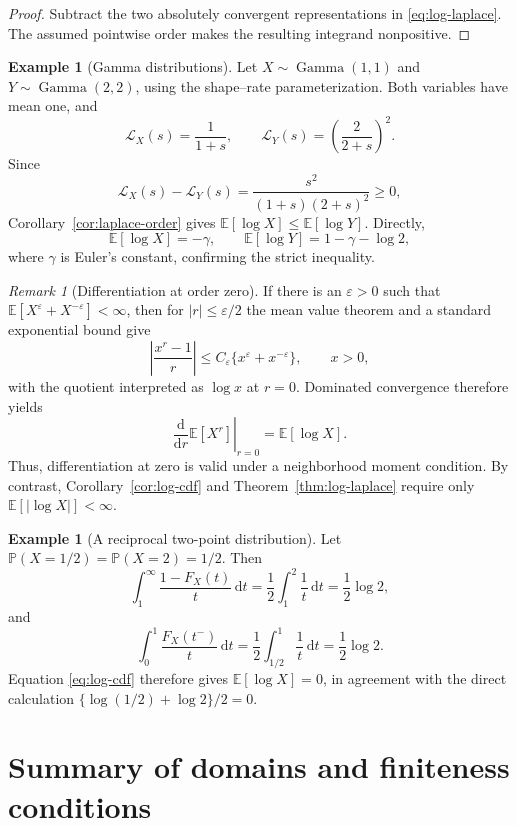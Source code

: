 \documentclass[11pt]{article}
\theoremstyle{definition}
\newtheorem{example}[theorem]{Example}
\theoremstyle{remark}
\newtheorem{remark}[theorem]{Remark}
\newcommand{\E}{\mathbb{E}}
\newcommand{\Pp}{\mathbb{P}}
\newcommand{\dd}{\,\mathrm{d}}
\newcommand{\abs}[1]{\left\lvert #1\right\rvert}
\begin{document}
\begin{proof}
Subtract the two absolutely convergent representations in
\eqref{eq:log-laplace}.  The assumed pointwise order makes the resulting
integrand nonpositive.
\end{proof}

\begin{example}[Gamma distributions]\label{ex:gamma-order}
Let $X\sim\operatorname{Gamma}(1,1)$ and
$Y\sim\operatorname{Gamma}(2,2)$, using the shape--rate parameterization.
Both variables have mean one, and
\[
  \mathcal L_X(s)=\frac{1}{1+s},
  \qquad
  \mathcal L_Y(s)=\left(\frac{2}{2+s}\right)^2.
\]
Since
\[
  \mathcal L_X(s)-\mathcal L_Y(s)
  =\frac{s^2}{(1+s)(2+s)^2}\geq0,
\]
Corollary~\ref{cor:laplace-order} gives
$\E[\log X]\leq\E[\log Y]$.  Directly,
\[
  \E[\log X]=-\gamma,
  \qquad
  \E[\log Y]=1-\gamma-\log2,
\]
where $\gamma$ is Euler's constant, confirming the strict inequality.
\end{example}

\begin{remark}[Differentiation at order zero]\label{rem:derivative-zero}
If there is an $\varepsilon>0$ such that
$\E[X^\varepsilon+X^{-\varepsilon}]<\infty$, then for
$\abs r\leq\varepsilon/2$ the mean value theorem and a standard exponential
bound give
\[
  \left\lvert\frac{x^r-1}{r}\right\rvert
  \leq C_\varepsilon\{x^\varepsilon+x^{-\varepsilon}\},
  \qquad x>0,
\]
with the quotient interpreted as $\log x$ at $r=0$.  Dominated convergence
therefore yields
\[
  \left.\frac{\mathrm d}{\mathrm dr}\E[X^r]\right|_{r=0}
  =\E[\log X].
\]
Thus, differentiation at zero is valid under a neighborhood moment
condition.  By contrast, Corollary~\ref{cor:log-cdf} and
Theorem~\ref{thm:log-laplace} require only
$\E[\abs{\log X}]<\infty$.
\end{remark}

\begin{example}[A reciprocal two-point distribution]\label{ex:log-two-point}
Let $\Pp(X=1/2)=\Pp(X=2)=1/2$.  Then
\[
  \int_1^\infty\frac{1-F_X(t)}{t}\dd t
  =\frac12\int_1^2\frac{1}{t}\dd t
  =\frac12\log2,
\]
and
\[
  \int_0^1\frac{F_X(t^-)}{t}\dd t
  =\frac12\int_{1/2}^1\frac{1}{t}\dd t
  =\frac12\log2.
\]
Equation \eqref{eq:log-cdf} therefore gives $\E[\log X]=0$, in agreement
with the direct calculation
$\{\log(1/2)+\log2\}/2=0$.
\end{example}

\section{Summary of domains and finiteness conditions}
\label{sec:summary}
\end{document}
